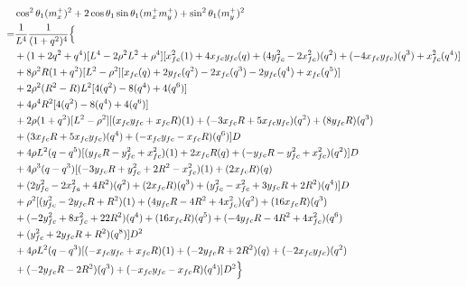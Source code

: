 \documentclass[12pt]{article}
\begin{document}
\begin{align}
    &\cos^2\theta_1(m_x^+)^2  + 2\cos\theta_1\sin\theta_1(m_x^+m_y^+)  +\sin^2\theta_1(m_y^+)^2 \\
    =& \frac{1}{L^4} \frac{1}{(1+q^2)^4} \Bigl\{ \nonumber\\
    &+ (1+2q^2+q^4) [ L^4 -2\rho^2L^2 + \rho^4 ][x_{fc}^2(1) + 4x_{fc}y_{fc}(q) + (4y_{fc}^2 -2x_{fc}^2)(q^2) + (- 4x_{fc}y_{fc})(q^3) +x_{fc}^2(q^4)   ] \nonumber\\
    &+  8\rho^2R(1+q^2)[ L^2 - \rho^2 ][ x_{fc}(q) + 2y_{fc}(q^2) - 2x_{fc}(q^3) - 2y_{fc}(q^4) + x_{fc}(q^5) ] \nonumber\\
    &+ 2\rho^2(R^2-R)L^2[4(q^2)-8(q^4)+4(q^6)] \nonumber\\
    &+ 4\rho^4R^2[ 4(q^2)-8(q^4)+4(q^6) ] \nonumber\\
    &+ 2\rho(1+q^2)[ L^2 - \rho^2 ][ (x_{fc}y_{fc} + x_{fc}R)(1) + ( - 3x_{fc}R + 5x_{fc}y_{fc} )(q^2) + (8y_{fc}R)(q^3) \nonumber\\
    &+ (3x_{fc}R + 5x_{fc}y_{fc})(q^4) + (- x_{fc}y_{fc} - x_{fc}R )(q^6) ]D \nonumber\\
    &+ 4\rho L^2(q-q^5)[( y_{fc}R -y_{fc}^2 + x_{fc}^2 )(1) + 2x_{fc}R(q)+  (-y_{fc}R -y_{fc}^2 + x_{fc}^2)(q^2) ]D \nonumber\\
    &+ 4\rho^3(q-q^3)[ (-3y_{fc}R + y_{fc}^2 +2R^2 -x_{fc}^2)(1)  + (2x_{fc}R)(q)  \nonumber\\
    &+  (2y_{fc}^2 -2x_{fc}^2 + 4R^2)(q^2) +(2x_{fc}R)(q^3) +(y_{fc}^2 -x_{fc}^2 + 3y_{fc}R +2R^2)(q^4)  ]D \nonumber\\
    &+ \rho^2[(y_{fc}^2 -2y_{fc}R+ R^2)(1) + (4y_{fc}R -4R^2+ 4x_{fc}^2)(q^2) + (16x_{fc}R)(q^3)  \nonumber\\
    &+ (-2y_{fc}^2+ 8x_{fc}^2 + 22R^2)(q^4) + (16x_{fc}R)(q^5) +  (-4y_{fc}R-4R^2 + 4x_{fc}^2)(q^6)   \nonumber\\
    &+ (y_{fc}^2+2y_{fc}R +R^2)(q^8)]D^2 \nonumber\\
    &+ 4\rho L^2(q-q^3)[ (-x_{fc}y_{fc} + x_{fc}R)(1) + (-2y_{fc}R + 2R^2)(q) + (-2x_{fc}y_{fc})(q^2)  \nonumber\\
    &+ (-2y_{fc}R  -2R^2)(q^3) + (-x_{fc}y_{fc} -x_{fc}R)(q^4) ]D^2 \Bigr\}
\end{align}
\end{document}
